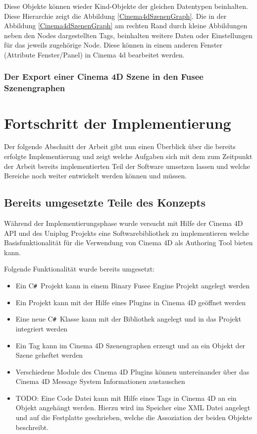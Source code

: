 \documentclass[pagesize, paper=a4, fontsize=12pt, titlepage=true, headings=small, headnosepline, abstractoff, liststotoc, nochapterprefix, plainheadsepline, twoside]{scrreprt}
\newcommand{\CSS}{C\texttt{\# }}
\begin{document}
Diese Objekte können wieder Kind-Objekte der gleichen Datentypen beinhalten. Diese Hierarchie zeigt die Abbildung \ref{Cinema4dSzenenGraph}. Die in der Abbildung \ref{Cinema4dSzenenGraph} am rechten Rand durch kleine Abbildungen neben den Nodes dargestellten Tags, beinhalten weitere Daten oder Einstellungen für das jeweils zugehörige Node. Diese können in einem anderen Fenster (Attribute Fenster/Panel) in Cinema 4d bearbeitet werden.



\subsubsection{Der Export einer Cinema 4D Szene in den Fusee Szenengraphen}


\section{Fortschritt der Implementierung}
Der folgende Abschnitt der Arbeit gibt nun einen Überblick über die bereits erfolgte Implementierung und zeigt welche Aufgaben sich mit dem zum Zeitpunkt der Arbeit bereits implementierten Teil der Software umsetzen lassen und welche Bereiche noch weiter entwickelt werden können und müssen.
\subsection{Bereits umgesetzte Teile des Konzepts}
Während der Implementierungsphase wurde versucht mit Hilfe der Cinema 4D API und des Uniplug Projekts eine Softwarebibliothek zu implementieren welche Basisfunktionalität für die Verwendung von Cinema 4D als Authoring Tool bieten kann. 

Folgende Funktionalität wurde bereits umgesetzt:
\begin{itemize}
\item Ein \CSS Projekt kann in einem Binary Fusee Engine Projekt angelegt werden
\item Ein Projekt kann mit der Hilfe eines Plugins in Cinema 4D geöffnet werden
\item Eine neue \CSS Klasse kann mit der Bibliothek angelegt und in das Projekt integriert werden
\item Ein Tag kann im Cinema 4D Szenengraphen erzeugt und an ein Objekt der Szene geheftet werden
\item Verschiedene Module des Cinema 4D Plugins können untereinander über das Cinema 4D Message System Informationen austauschen
\item TODO: Eine Code Datei kann mit Hilfe eines Tags in Cinema 4D an ein Objekt angehängt werden. Hierzu wird im Speicher eine XML Datei angelegt und auf die Festplatte geschrieben, welche die Assoziation der beiden Objekte beschreibt.
\end{itemize}
\end{document}
